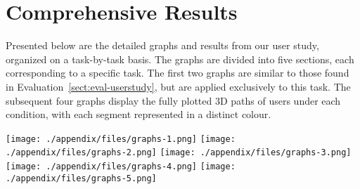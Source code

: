 \section{Comprehensive Results}
Presented below are the detailed graphs and results from our user study, organized on a task-by-task basis. The graphs are divided into five sections, each corresponding to a specific task. The first two graphs are similar to those found in Evaluation~\ref{sect:eval-userstudy}, but are applied exclusively to this task. The subsequent four graphs display the fully plotted 3D paths of users under each condition, with each segment represented in a distinct colour.

\newpage
\texttt{[image: ./appendix/files/graphs-1.png]}
\newpage
\texttt{[image: ./appendix/files/graphs-2.png]}
\newpage
\texttt{[image: ./appendix/files/graphs-3.png]}
\newpage
\texttt{[image: ./appendix/files/graphs-4.png]}
\newpage
\texttt{[image: ./appendix/files/graphs-5.png]}
